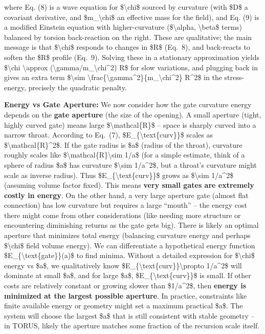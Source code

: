 \documentclass[]{article}
\begin{document}
where Eq. (8) is a wave equation for \$\textbackslash{}chi\$ sourced by
curvature (with \$D\$ a covariant derivative, and
\$m\_\textbackslash{}chi\$ an effective mass for the field), and Eq. (9)
is a modified Einstein equation with higher-curvature
(\$\textbackslash{}alpha, \textbackslash{}beta\$ terms) balanced by
torsion back-reaction on the right. These are qualitative; the main
message is that \$\textbackslash{}chi\$ responds to changes in \$R\$
(Eq.~8), and back-reacts to soften the \$R\$ profile (Eq.~9). Solving
these in a stationary approximation yields \$\textbackslash{}chi
\textbackslash{}approx
(\textbackslash{}gamma/m\_\textbackslash{}chi\^{}2) R\$ for slow
variations, and plugging back in gives an extra term
\$\textbackslash{}sim
\textbackslash{}frac\{\textbackslash{}gamma\^{}2\}\{m\_\textbackslash{}chi\^{}2\}
R\^{}2\$ in the stress-energy, precisely the quadratic penalty.

\textbf{Energy vs Gate Aperture:} We now consider how the gate curvature
energy depends on the \textbf{gate aperture} (the size of the opening).
A small aperture (tight, highly curved gate) means large
\$\textbackslash{}mathcal\{R\}\$ -- space is sharply curved into a
narrow throat. According to Eq.~(7),
\$E\_\{\textbackslash{}text\{curv\}\}\$ scales as
\$\textbackslash{}mathcal\{R\}\^{}2\$. If the gate radius is \$a\$
(radius of the throat), curvature roughly scales like
\$\textbackslash{}mathcal\{R\}\textbackslash{}sim 1/a\$ (for a simple
estimate, think of a sphere of radius \$a\$ has curvature
\$\textbackslash{}sim 1/a\^{}2\$, but a throat's curvature might scale
as inverse radius). Thus \$E\_\{\textbackslash{}text\{curv\}\}\$ grows
as \$\textbackslash{}sim 1/a\^{}2\$ (assuming volume factor fixed). This
means \textbf{very small gates are extremely costly in energy}. On the
other hand, a very large aperture gate (almost flat connection) has low
curvature but requires a large ``mouth'' -- the energy cost there might
come from other considerations (like needing more structure or
encountering diminishing returns as the gate gets big). There is likely
an optimal aperture that minimizes total energy (balancing curvature
energy and perhaps \$\textbackslash{}chi\$ field volume energy). We can
differentiate a hypothetical energy function
\$E\_\{\textbackslash{}text\{gate\}\}(a)\$ to find minima. Without a
detailed expression for \$\textbackslash{}chi\$ energy vs \$a\$, we
qualitatively know
\$E\_\{\textbackslash{}text\{curv\}\}\textbackslash{}propto 1/a\^{}2\$
will dominate at small \$a\$, and for large \$a\$,
\$E\_\{\textbackslash{}text\{curv\}\}\$ is small. If other costs are
relatively constant or growing slower than \$1/a\^{}2\$, then
\textbf{energy is minimized at the largest possible aperture}. In
practice, constraints like finite available energy or geometry might set
a maximum practical \$a\$. The system will choose the largest \$a\$ that
is still consistent with stable geometry -- in TORUS, likely the
aperture matches some fraction of the recursion scale itself.
\end{document}
